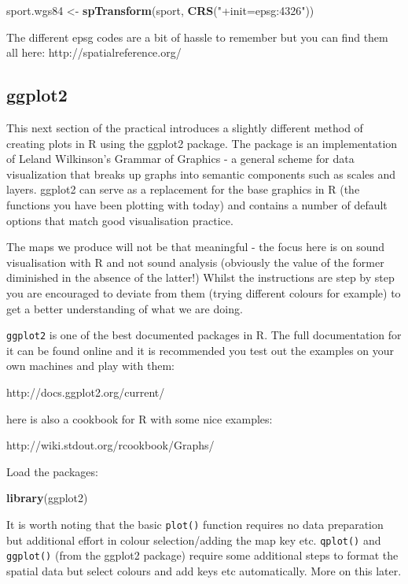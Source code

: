 \documentclass[]{article}
\newenvironment{Shaded}{}{}
\newcommand{\KeywordTok}[1]{\textcolor[rgb]{0.00,0.44,0.13}{\textbf{{#1}}}}
\newcommand{\StringTok}[1]{\textcolor[rgb]{0.25,0.44,0.63}{{#1}}}
\newcommand{\NormalTok}[1]{{#1}}
\begin{document}
\begin{Shaded}
\begin{Highlighting}[]
\NormalTok{sport.wgs84 <- }\KeywordTok{spTransform}\NormalTok{(sport, }\KeywordTok{CRS}\NormalTok{(}\StringTok{"+init=epsg:4326"}\NormalTok{))}
\end{Highlighting}
\end{Shaded}
The different epsg codes are a bit of hassle to remember but you can
find them all here: http://spatialreference.org/

\subsection{ggplot2}

This next section of the practical introduces a slightly different
method of creating plots in R using the ggplot2 package. The package is
an implementation of Leland Wilkinson's Grammar of Graphics - a general
scheme for data visualization that breaks up graphs into semantic
components such as scales and layers. ggplot2 can serve as a replacement
for the base graphics in R (the functions you have been plotting with
today) and contains a number of default options that match good
visualisation practice.

The maps we produce will not be that meaningful - the focus here is on
sound visualisation with R and not sound analysis (obviously the value
of the former diminished in the absence of the latter!) Whilst the
instructions are step by step you are encouraged to deviate from them
(trying different colours for example) to get a better understanding of
what we are doing.

\texttt{ggplot2} is one of the best documented packages in R. The full
documentation for it can be found online and it is recommended you test
out the examples on your own machines and play with them:

http://docs.ggplot2.org/current/

here is also a cookbook for R with some nice examples:

http://wiki.stdout.org/rcookbook/Graphs/

Load the packages:

\begin{Shaded}
\begin{Highlighting}[]
\KeywordTok{library}\NormalTok{(ggplot2)}
\end{Highlighting}
\end{Shaded}
It is worth noting that the basic \texttt{plot()} function requires no
data preparation but additional effort in colour selection/adding the
map key etc. \texttt{qplot()} and \texttt{ggplot()} (from the ggplot2
package) require some additional steps to format the spatial data but
select colours and add keys etc automatically. More on this later.
\end{document}

